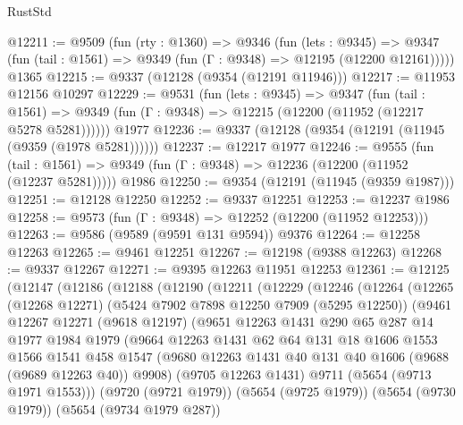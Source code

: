 \begin{lexlean}{RustStd}
\begin{coremodule}
@12211 := @9509
    (fun (rty : @1360) =>
    @9346
      (fun (lets : @9345) =>
      @9347 (fun (tail : @1561) => @9349 (fun (Γ : @9348) => @12195 (@12200 @12161)))))
    @1365
@12215 := @9337 (@12128 (@9354 (@12191 @11946)))
@12217 := @11953 @12156 @10297
@12229 := @9531
    (fun (lets : @9345) =>
    @9347
      (fun (tail : @1561) =>
      @9349 (fun (Γ : @9348) => @12215 (@12200 (@11952 (@12217 @5278 @5281))))))
    @1977
@12236 := @9337 (@12128 (@9354 (@12191 (@11945 (@9359 (@1978 @5281))))))
@12237 := @12217 @1977
@12246 := @9555
    (fun (tail : @1561) => @9349 (fun (Γ : @9348) => @12236 (@12200 (@11952 (@12237 @5281)))))
    @1986
@12250 := @9354 (@12191 (@11945 (@9359 @1987)))
@12251 := @12128 @12250
@12252 := @9337 @12251
@12253 := @12237 @1986
@12258 := @9573 (fun (Γ : @9348) => @12252 (@12200 (@11952 @12253)))
@12263 := @9586 (@9589 (@9591 @131 @9594)) @9376
@12264 := @12258 @12263
@12265 := @9461 @12251
@12267 := @12198 (@9388 @12263)
@12268 := @9337 @12267
@12271 := @9395 @12263 @11951 @12253
@12361 := @12125
    (@12147
      (@12186
        (@12188
          (@12190
            (@12211
              (@12229
                (@12246
                  (@12264
                    (@12265
                      (@12268 @12271)
                      (@5424 @7902 @7898 @12250 @7909 (@5295 @12250))
                      (@9461
                        @12267
                        @12271
                        (@9618 @12197)
                        (@9651
                          @12263
                          @1431
                          @290
                          @65
                          @287
                          @14
                          @1977
                          @1984
                          @1979
                          (@9664
                            @12263
                            @1431
                            @62
                            @64
                            @131
                            @18
                            @1606
                            @1553
                            @1566
                            @1541
                            @458
                            @1547
                            (@9680 @12263 @1431 @40 @131 @40 @1606 (@9688 (@9689 @12263 @40)) @9908)
                            (@9705 @12263 @1431)
                            @9711
                            (@5654 (@9713 @1971 @1553)))
                          (@9720 (@9721 @1979))
                          (@5654 (@9725 @1979))
                          (@5654 (@9730 @1979))
                          (@5654 (@9734 @1979 @287))

\end{coremodule}
\end{lexlean}

